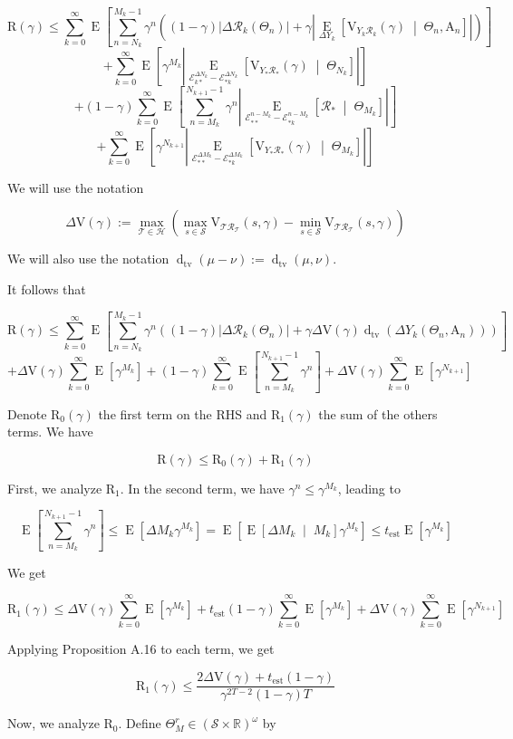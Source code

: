 \documentclass[a4paper]{article}
\newcommand{\AP}[1]{\left(#1\right)}
\newcommand{\AB}[1]{\left[#1\right]}
\newcommand{\ABM}[2]{\left[#1\;\middle\vert\;#2\right]}
\newcommand{\Abs}[1]{\left\vert #1 \right\vert}
\newcommand{\E}[1]{\operatorname{E}\AB{#1}}
\newcommand{\CE}[3]{\underset{#1}{\operatorname{E}}\ABM{#2}{#3}}
\newcommand{\Dtva}[1]{\operatorname{d}_{\text{tv}}\AP{#1}}
\newcommand{\Reals}{\mathbb{R}}
\newcommand{\St}{\mathcal{S}}
\newcommand{\R}{\mathcal{R}}
\newcommand{\T}{\mathcal{T}}
\newcommand{\Hy}{\mathcal{H}}
\newcommand{\Est}{\mathrm{est}}
\newcommand{\V}{\mathrm{V}}
\newcommand{\Reg}{\mathrm{R}}
\newcommand{\THy}{Y_*}
\newcommand{\SHy}{Y}
\newcommand{\AT}{\mathrm{A}}
\newcommand{\Ev}{\mathcal{E}}
\newcommand{\ET}{N}
\newcommand{\IT}{M}
\begin{document}
$$\Reg(\gamma)\leq\sum_{k=0}^\infty\E{\sum_{n=\ET_k}^{\IT_k-1}\gamma^{n}\AP{(1-\gamma)\Abs{\Delta\R_k\AP{\Theta_n}}+\gamma\Abs{\CE{\Delta\SHy_k}{\V_{\SHy_k\R_k}(\gamma)}{\Theta_n,\AT_n}}}}$$
$$+\sum_{k=0}^\infty\E{{\gamma^{\IT_k}}\Abs{\CE{\Ev_{k*}^{\Delta\ET_k}-\Ev_{*k}^{\Delta\ET_k}}{\V_{\SHy_*\R_*}(\gamma)}{\Theta_{\ET_k}}}}$$
$$+(1-\gamma)\sum_{k=0}^\infty\E{\sum_{n=\IT_k}^{\ET_{k+1}-1}\gamma^n\Abs{\CE{\Ev_{**}^{n-\IT_k}-\Ev_{*k}^{n-\IT_k}}{\R_*}{\Theta_{\IT_k}}}}$$
$$+\sum_{k=0}^\infty\E{\gamma^{\ET_{k+1}}\Abs{\CE{\Ev_{**}^{\Delta\IT_k}-\Ev_{*k}^{\Delta\IT_k}}{\V_{\THy\R_*}(\gamma)}{\Theta_{\IT_k}}}}$$

We will use the notation

$$\Delta\V(\gamma):=\max_{\T\in\Hy}{\AP{\max_{s\in\St}{\V_{\T\R_\T}(s,\gamma)}-\min_{s\in\St}{\V_{\T\R_\T}(s,\gamma)}}}$$

We will also use the notation $\Dtva{\mu-\nu}:=\Dtva{\mu,\nu}$.

It follows that

$$\Reg(\gamma)\leq\sum_{k=0}^\infty\E{\sum_{n=\ET_k}^{\IT_k-1}\gamma^{n}\AP{(1-\gamma)\Abs{\Delta\R_k\AP{\Theta_n}}+\gamma\Delta\V(\gamma)\Dtva{\Delta\SHy_k\AP{\Theta_n,\AT_n}}}}$$
$$+\Delta\V(\gamma)\sum_{k=0}^\infty\E{{\gamma^{\IT_k}}}+(1-\gamma)\sum_{k=0}^\infty\E{\sum_{n=\IT_k}^{\ET_{k+1}-1}\gamma^n}+\Delta\V(\gamma)\sum_{k=0}^\infty\E{\gamma^{\ET_{k+1}}}$$

Denote $\Reg_{0}(\gamma)$ the first term on the RHS and $\Reg_{1}(\gamma)$ the sum of the others terms. We have

$$\Reg(\gamma)\leq\Reg_0(\gamma)+\Reg_1(\gamma)$$

First, we analyze $\Reg_1$. In the second term, we have $\gamma^n\leq\gamma^{M_k}$, leading to

$$\E{\sum_{n=\IT_k}^{\ET_{k+1}-1}\gamma^n}\leq\E{\Delta M_k\gamma^{M_k}}=\E{\CE{}{\Delta M_k}{M_k}\gamma^{M_k}}\leq t_\Est\E{\gamma^{M_k}}$$

We get

$$\Reg_1(\gamma)\leq\Delta\V(\gamma)\sum_{k=0}^\infty\E{{\gamma^{\IT_k}}}+t_\Est(1-\gamma)\sum_{k=0}^\infty\E{\gamma^{M_k}}+\Delta\V(\gamma)\sum_{k=0}^\infty\E{\gamma^{\ET_{k+1}}}$$

Applying Proposition A.16 to each term, we get

$$\Reg_1(\gamma)\leq\frac{2\Delta\V(\gamma)+t_\Est(1-\gamma)}{\gamma^{2T-2}(1-\gamma)T}$$

Now, we analyze $\Reg_0$. Define $\Theta_M^r\in\AP{\St\times\Reals}^\omega$ by
\end{document}
